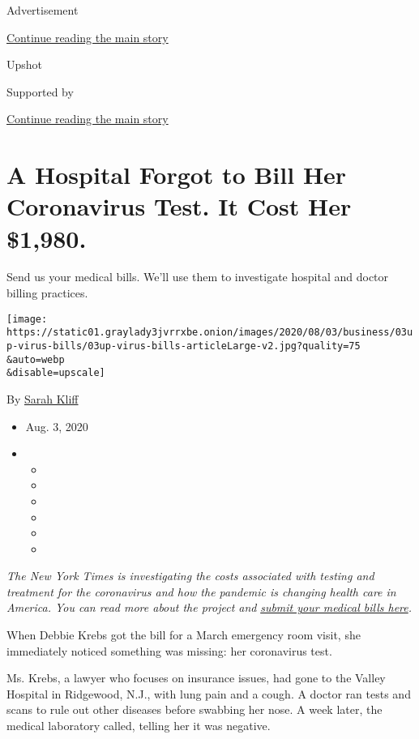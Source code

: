 Advertisement

\protect\hyperlink{after-top}{Continue reading the main story}

Upshot

Supported by

\protect\hyperlink{after-sponsor}{Continue reading the main story}

\hypertarget{a-hospital-forgot-to-bill-her-coronavirus-test-it-cost-her-1980}{%
\section{A Hospital Forgot to Bill Her Coronavirus Test. It Cost Her
\$1,980.}\label{a-hospital-forgot-to-bill-her-coronavirus-test-it-cost-her-1980}}

Send us your medical bills. We'll use them to investigate hospital and
doctor billing practices.

\texttt{[image: https://static01.graylady3jvrrxbe.onion/images/2020/08/03/business/03up-virus-bills/03up-virus-bills-articleLarge-v2.jpg?quality=75\\\&auto=webp\\\&disable=upscale]}

By \href{https://www.nytimes3xbfgragh.onion/by/sarah-kliff}{Sarah Kliff}

\begin{itemize}
\item
  Aug. 3, 2020
\item
  \begin{itemize}
  \item
  \item
  \item
  \item
  \item
  \item
  \end{itemize}
\end{itemize}

\emph{The New York Times is investigating the costs associated with
testing and treatment for the coronavirus and how the pandemic is
changing health care in America. You can read more about the project
and}
\href{https://www.nytimes3xbfgragh.onion/2020/08/03/reader-center/coronavirus-medical-bills.html}{\emph{submit
your medical bills here}}\emph{.}

When Debbie Krebs got the bill for a March emergency room visit, she
immediately noticed something was missing: her coronavirus test.

Ms. Krebs, a lawyer who focuses on insurance issues, had gone to the
Valley Hospital in Ridgewood, N.J., with lung pain and a cough. A doctor
ran tests and scans to rule out other diseases before swabbing her nose.
A week later, the medical laboratory called, telling her it was
negative.

